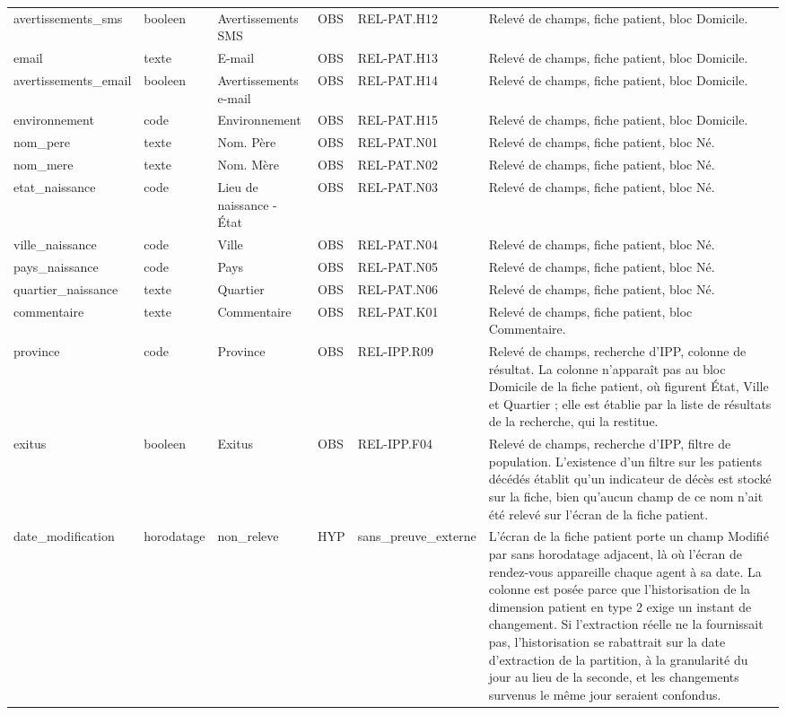 \begin{longtable}{p{2.5cm}p{1.8cm}p{2.8cm}p{1.3cm}p{2.2cm}p{5cm}}
avertissements\_sms & booleen & Avertissements SMS & OBS & REL-PAT.H12 & Relevé de champs, fiche patient, bloc Domicile. \\
email & texte & E-mail & OBS & REL-PAT.H13 & Relevé de champs, fiche patient, bloc Domicile. \\
avertissements\_email & booleen & Avertissements e-mail & OBS & REL-PAT.H14 & Relevé de champs, fiche patient, bloc Domicile. \\
environnement & code & Environnement & OBS & REL-PAT.H15 & Relevé de champs, fiche patient, bloc Domicile. \\
nom\_pere & texte & Nom. Père & OBS & REL-PAT.N01 & Relevé de champs, fiche patient, bloc Né. \\
nom\_mere & texte & Nom. Mère & OBS & REL-PAT.N02 & Relevé de champs, fiche patient, bloc Né. \\
etat\_naissance & code & Lieu de naissance - État & OBS & REL-PAT.N03 & Relevé de champs, fiche patient, bloc Né. \\
ville\_naissance & code & Ville & OBS & REL-PAT.N04 & Relevé de champs, fiche patient, bloc Né. \\
pays\_naissance & code & Pays & OBS & REL-PAT.N05 & Relevé de champs, fiche patient, bloc Né. \\
quartier\_naissance & texte & Quartier & OBS & REL-PAT.N06 & Relevé de champs, fiche patient, bloc Né. \\
commentaire & texte & Commentaire & OBS & REL-PAT.K01 & Relevé de champs, fiche patient, bloc Commentaire. \\
province & code & Province & OBS & REL-IPP.R09 & Relevé de champs, recherche d'IPP, colonne de résultat. La colonne n'apparaît pas au bloc Domicile de la fiche patient, où figurent État, Ville et Quartier ; elle est établie par la liste de résultats de la recherche, qui la restitue. \\
exitus & booleen & Exitus & OBS & REL-IPP.F04 & Relevé de champs, recherche d'IPP, filtre de population. L'existence d'un filtre sur les patients décédés établit qu'un indicateur de décès est stocké sur la fiche, bien qu'aucun champ de ce nom n'ait été relevé sur l'écran de la fiche patient. \\
date\_modification & horodatage & non\_releve & HYP & sans\_preuve\_externe & L'écran de la fiche patient porte un champ Modifié par sans horodatage adjacent, là où l'écran de rendez-vous appareille chaque agent à sa date. La colonne est posée parce que l'historisation de la dimension patient en type 2 exige un instant de changement. Si l'extraction réelle ne la fournissait pas, l'historisation se rabattrait sur la date d'extraction de la partition, à la granularité du jour au lieu de la seconde, et les changements survenus le même jour seraient confondus. \\

\end{longtable}
